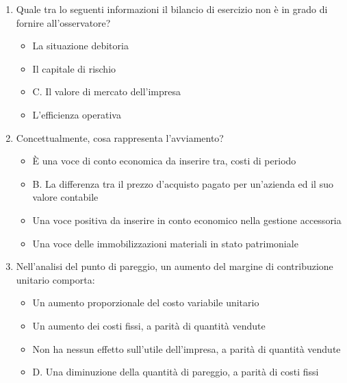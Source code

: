 \documentclass{article}
\begin{document}
\begin{enumerate}
    \item Quale tra lo seguenti informazioni il bilancio di esercizio non è in grado di fornire all'osservatore?
          \begin{itemize}
              \item[\sout{A.}] La situazione debitoria
              \item[\sout{B.}] Il capitale di rischio
              \item[\checkmark] C. Il valore di mercato dell'impresa
              \item[\sout{D.}] L'efficienza operativa
          \end{itemize}

    \item Concettualmente, cosa rappresenta l'avviamento?
          \begin{itemize}
              \item[\sout{A.}] È una voce di conto economica da inserire tra, costi di periodo
              \item[\checkmark] B. La differenza tra il prezzo d'acquisto pagato per un'azienda ed il suo valore contabile
              \item[\sout{C.}] Una voce positiva da inserire in conto economico nella gestione accessoria
              \item[\sout{D.}] Una voce delle immobilizzazioni materiali in stato patrimoniale
          \end{itemize}

    \item Nell'analisi del punto di pareggio, un aumento del margine di contribuzione unitario comporta:
          \begin{itemize}
              \item[\sout{A.}] Un aumento proporzionale del costo variabile unitario
              \item[\sout{B.}] Un aumento dei costi fissi, a parità di quantità vendute
              \item[\sout{C.}] Non ha nessun effetto sull'utile dell'impresa, a parità di quantità vendute
              \item[\checkmark] D. Una diminuzione della quantità di pareggio, a parità di costi fissi
          \end{itemize}
\end{enumerate}
\newpage
\end{document}
